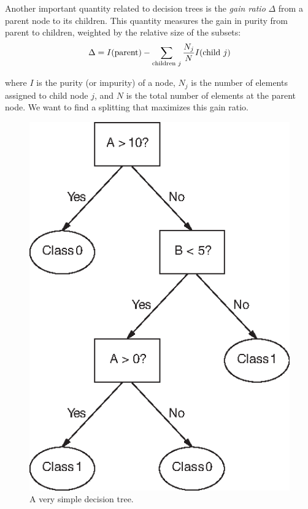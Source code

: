 Another important quantity related to decision trees is the \emph{gain
  ratio}  $\Delta$ from a parent node to its children. This quantity
measures the gain in purity from parent to children, weighted by the
relative size of the subsets:\vspace*{9pt}
%
\[
\Delta = I(\text{parent}) 
         - \sum_{\text{\scriptsize children $j$}} \frac{N_j}{N} I( \text{child $j$} )
\]
\vskip4pt

\noindent 
where $I$ is the purity (or impurity) of a node, $N_j$ is the number
of elements assigned to child node $j$, and $N$ is the total number of
elements at the parent node. We want to find a splitting that
maximizes this gain ratio.

\begin{figure}
\centerline{ \includegraphics{img/dectree}}
  \caption{A very simple decision tree.}
  \label{fig:decisiontree}\vspace*{12pt}
\end{figure}


